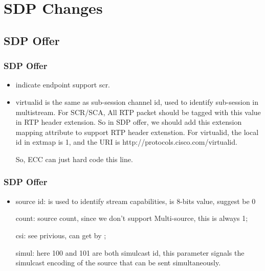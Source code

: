 \documentclass{beamer}
\begin{document}
\section{SDP Changes}
\subsection{SDP Offer} %
\begin{frame}
  \frametitle{SDP Offer}
  {\small
  \begin{itemize}
    \setlength\itemsep{1em}
    \item {}

      {\footnotesize
      indicate endpoint support scr.
    }

    \item {}

      {\footnotesize
      virtualid is the same as sub-session channel id, used to identify sub-session in multistream. For SCR/SCA, All RTP packet should be tagged with this value in RTP header extension. 
      So in SDP offer, we should add this extension mapping attribute to support RTP header extenstion.
      For virtualid, the local id in extmap is 1, and the URI is http://protocols.cisco.com/virtualid. 
      
      So, ECC can just hard code this line.
    }

  \end{itemize}
}
\end{frame}

\begin{frame}
  \frametitle{SDP Offer}
  {\small
  \begin{itemize}
    \setlength\itemsep{1em}
%
    \item {}
      
      {\footnotesize
      source id: is used to identify stream capabilities, is 8-bits value, suggest be 0

      count: source count, since we don't support Multi-source, this is always 1;

      csi: see privious, can get by ;

      simul: here 100 and 101 are both simulcast id, this parameter signals the simulcast encoding of the source that can be sent simultaneously. 
    }

  \end{itemize}
}
\end{frame}
\end{document}
